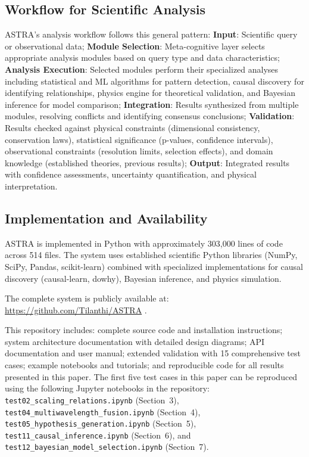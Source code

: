\documentclass[usenatbib]{rasti}
\begin{document}
\subsection{Workflow for Scientific Analysis}

ASTRA's analysis workflow follows this general pattern: \textbf{Input}: Scientific query or observational data; \textbf{Module Selection}: Meta-cognitive layer selects appropriate analysis modules based on query type and data characteristics; \textbf{Analysis Execution}: Selected modules perform their specialized analyses including statistical and ML algorithms for pattern detection, causal discovery for identifying relationships, physics engine for theoretical validation, and Bayesian inference for model comparison; \textbf{Integration}: Results synthesized from multiple modules, resolving conflicts and identifying consensus conclusions; \textbf{Validation}: Results checked against physical constraints (dimensional consistency, conservation laws), statistical significance (p-values, confidence intervals), observational constraints (resolution limits, selection effects), and domain knowledge (established theories, previous results); \textbf{Output}: Integrated results with confidence assessments, uncertainty quantification, and physical interpretation.

\subsection{Implementation and Availability}

ASTRA is implemented in Python with approximately 303,000 lines of code across 514 files. The system uses established scientific Python libraries (NumPy, SciPy, Pandas, scikit-learn) combined with specialized implementations for causal discovery (causal-learn, dowhy), Bayesian inference, and physics simulation.

The complete system is publicly available at: \url{https://github.com/Tilanthi/ASTRA} \cite{astra_github}.

This repository includes: complete source code and installation instructions; system architecture documentation with detailed design diagrams; API documentation and user manual; extended validation with 15 comprehensive test cases; example notebooks and tutorials; and reproducible code for all results presented in this paper. The first five test cases in this paper can be reproduced using the following Jupyter notebooks in the repository: \texttt{test02\_scaling\_relations.ipynb} (Section~3), \texttt{test04\_multiwavelength\_fusion.ipynb} (Section~4), \texttt{test05\_hypothesis\_generation.ipynb} (Section~5), \texttt{test11\_causal\_inference.ipynb} (Section~6), and \texttt{test12\_bayesian\_model\_selection.ipynb} (Section~7).
\end{document}
